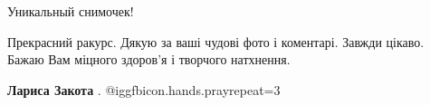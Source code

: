  
 
 
 
 

Уникальный снимочек!

Прекрасний ракурс. Дякую за ваші чудові фото і коментарі. Завжди цікаво. Бажаю Вам міцного здоров'я і творчого натхнення.

\textbf{Лариса Закота} . @igg{fbicon.hands.pray}{repeat=3} 
